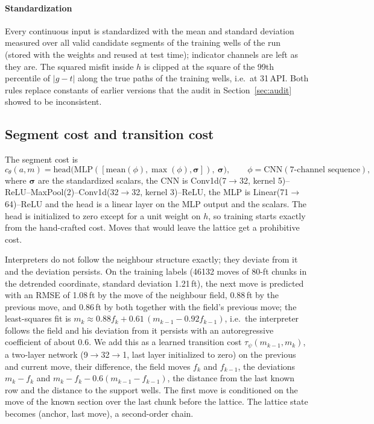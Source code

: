 \documentclass[preprint,12pt,authoryear]{elsarticle}
\begin{document}
\paragraph{Standardization}\label{sec:std}
Every continuous input is standardized with the mean and standard deviation measured over all valid candidate segments of the training wells of the run (stored with the weights and reused at test time); indicator channels are left as they are. The squared misfit inside $h$ is clipped at the square of the 99th percentile of $|g-t|$ along the true paths of the training wells, i.e.\ at 31\,API. Both rules replace constants of earlier versions that the audit in Section~\ref{sec:audit} showed to be inconsistent.

\subsection{Segment cost and transition cost}\label{sec:costs}
The segment cost is
\begin{equation}
c_\theta(a,m) = \mathrm{head}\big(\mathrm{MLP}([\mathrm{mean}(\phi),\max(\phi),\boldsymbol{\sigma}]),\ \boldsymbol{\sigma}\big),\qquad \phi = \mathrm{CNN}(\text{7-channel sequence}),
\end{equation}
where $\boldsymbol{\sigma}$ are the standardized scalars, the CNN is Conv1d(7$\to$32, kernel 5)--ReLU--MaxPool(2)--Conv1d(32$\to$32, kernel 3)--ReLU, the MLP is Linear(71$\to$64)--ReLU and the head is a linear layer on the MLP output and the scalars. The head is initialized to zero except for a unit weight on $h$, so training starts exactly from the hand-crafted cost. Moves that would leave the lattice get a prohibitive cost.

Interpreters do not follow the neighbour structure exactly; they deviate from it and the deviation persists. On the training labels (\num{46132} moves of 80-ft chunks in the detrended coordinate, standard deviation 1.21\,ft), the next move is predicted with an RMSE of 1.08\,ft by the move of the neighbour field, 0.88\,ft by the previous move, and 0.86\,ft by both together with the field's previous move; the least-squares fit is $m_k\approx0.88f_k+0.61\,(m_{k-1}-0.92f_{k-1})$, i.e.\ the interpreter follows the field and his deviation from it persists with an autoregressive coefficient of about 0.6. We add this as a learned transition cost $\tau_\psi(m_{k-1},m_k)$, a two-layer network (9$\to$32$\to$1, last layer initialized to zero) on the previous and current move, their difference, the field moves $f_k$ and $f_{k-1}$, the deviations $m_k-f_k$ and $m_k-f_k-0.6(m_{k-1}-f_{k-1})$, the distance from the last known row and the distance to the support wells. The first move is conditioned on the move of the known section over the last chunk before the lattice. The lattice state becomes (anchor, last move), a second-order chain.
\end{document}
